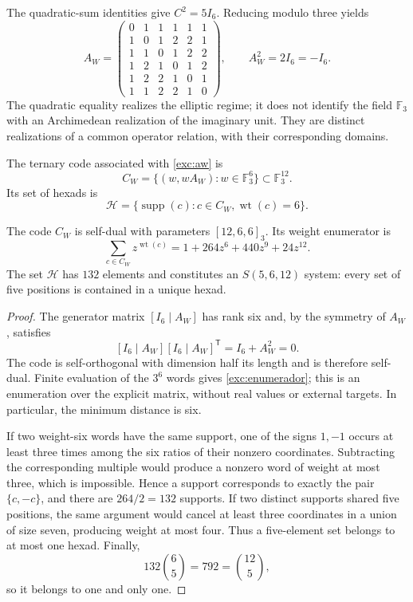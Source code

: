 The quadratic-sum identities give $C^2=5I_6$. Reducing modulo
three yields
\begin{equation}
 A_W=
 \begin{pmatrix}
 0&1&1&1&1&1\\
 1&0&1&2&2&1\\
 1&1&0&1&2&2\\
 1&2&1&0&1&2\\
 1&2&2&1&0&1\\
 1&1&2&2&1&0
 \end{pmatrix},
 \qquad A_W^2=2I_6=-I_6.
 \label{exc:aw}
\end{equation}
The quadratic equality realizes the elliptic regime;\linebreak
it does not identify the
field $\mathbb F_3$ with an Archimedean realization of the imaginary
unit. They are distinct realizations of a common operator
relation, with their corresponding domains.

\begin{definition}
\label{exc:codigo}
The ternary code associated with \eqref{exc:aw} is
\[
 C_W=\{(w,wA_W):w\in\mathbb F_3^6\}
       \subset\mathbb F_3^{12}.
\]
Its set of hexads is
\[
 \mathcal H=
 \{\operatorname{supp}(c):c\in C_W,
                           \operatorname{wt}(c)=6\}.
\]
\end{definition}

\begin{proposition}
\label{exc:codigo-witt}
The code $C_W$ is self-dual with parameters $[12,6,6]_3$. Its weight
enumerator is
\begin{equation}
 \sum_{c\in C_W}z^{\operatorname{wt}(c)}
   =1+264z^6+440z^9+24z^{12}.
 \label{exc:enumerador}
\end{equation}
The set $\mathcal H$ has $132$ elements and constitutes an
$S(5,6,12)$ system: every set of five positions is contained in a
unique hexad.
\end{proposition}

\begin{proof}
The generator matrix $[I_6\mid A_W]$ has rank six and, by the symmetry
of $A_W$, satisfies
\[
 [I_6\mid A_W][I_6\mid A_W]^{\mathsf T}
   =I_6+A_W^2=0.
\]
The code is self-orthogonal with dimension half its length and is therefore
self-dual. Finite evaluation of the $3^6$ words gives
\eqref{exc:enumerador}; this is an enumeration over the explicit matrix,
without real values or external targets. In particular, the minimum
distance is six.

If two weight-six words have the same support, one of the signs $1,-1$
occurs at least three times among the six ratios of their nonzero
coordinates. Subtracting the corresponding multiple would produce
a nonzero word of weight at most three, which is impossible. Hence a support
corresponds to exactly the pair $\{c,-c\}$, and there are $264/2=132$
supports. If two distinct supports shared five positions,
the same argument would cancel at least three coordinates in a union
of size seven, producing weight at most four. Thus a
five-element set belongs to at most one hexad. Finally,
\[
 132\binom65=792=\binom{12}5,
\]
so it belongs to one and only one.
\end{proof}

